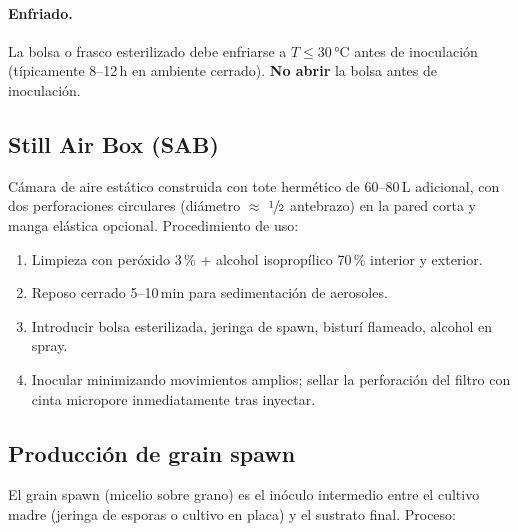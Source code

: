 \paragraph{Enfriado.} La bolsa o frasco esterilizado debe enfriarse a
$T \leq 30\,\si{\celsius}$ antes de inoculación (típicamente 8--12\,h en
ambiente cerrado). \textbf{No abrir} la bolsa antes de inoculación.

\subsection{Still Air Box (SAB)}
\label{sec:preparacion:sab}

Cámara de aire estático construida con tote hermético de 60--80\,L
adicional, con dos perforaciones circulares (diámetro $\approx$
$\sfrac{1}{2}$ antebrazo) en la pared corta y manga elástica opcional.
Procedimiento de uso:

\begin{enumerate}[leftmargin=*,itemsep=0pt]
  \item Limpieza con peróxido 3\,\% + alcohol isopropílico 70\,\%
        interior y exterior.
  \item Reposo cerrado 5--10\,min para sedimentación de aerosoles.
  \item Introducir bolsa esterilizada, jeringa de spawn, bisturí
        flameado, alcohol en spray.
  \item Inocular minimizando movimientos amplios; sellar la perforación
        del filtro con cinta micropore inmediatamente tras inyectar.
\end{enumerate}


\subsection{Producción de grain spawn}
\label{sec:preparacion:spawn}

El grain spawn (micelio sobre grano) es el inóculo intermedio entre el
cultivo madre (jeringa de esporas o cultivo en placa) y el sustrato
final. Proceso:

